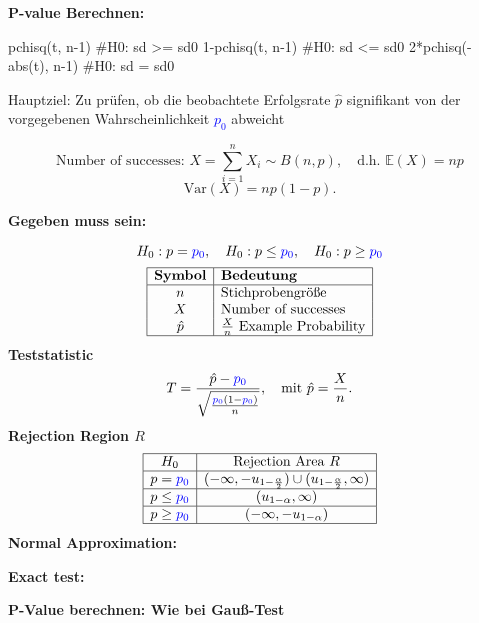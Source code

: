 \textbf{P-value Berechnen:}
\begin{rcode}{1}
pchisq(t, n-1) #H0: sd >= sd0
1-pchisq(t, n-1) #H0: sd <= sd0
2*pchisq(-abs(t), n-1) #H0: sd = sd0
\end{rcode}

\columnbreak
\begin{center}
\end{center}
\normalsize

Hauptziel: Zu prüfen, ob die beobachtete Erfolgsrate $\hat{p}$ signifikant von der vorgegebenen Wahrscheinlichkeit \textcolor{blue}{$p_0$} abweicht
\begin{center}
$$
\text{Number of successes: } X = \sum_{i=1}^n X_i \sim B(n, p), \quad \text{d.h. } \mathbb{E}(X) = np
$$$$
\text{Var}(X) = np(1-p).
$$
\end{center}
\large{\textbf{Gegeben muss sein:}}

\[
H_0: p = \textcolor{blue}{\textcolor{blue}{p_0}}, \quad H_0: p \leq \textcolor{blue}{p_0}, \quad H_0: p \geq \textcolor{blue}{p_0}
\]
\[
\begin{array}{|c|l|}
\hline
\textbf{Symbol} & \textbf{Bedeutung} \\
\hline
n& \text{Stichprobengröße} \\
X & \text{Number of successes} \\
\hat{p}& \frac{X}{n} \text{ Example Probability} \\
\hline
\end{array}
\]
\large{\textbf{Teststatistic}}
$$
T = \frac{\hat{p} - \textcolor{blue}{p_0}}{\sqrt{\frac{\textcolor{blue}{p_0}(1-\textcolor{blue}{p_0})}{n}}}, \quad \text{mit } \hat{p} = \frac{X}{n}.
$$
\large{\textbf{Rejection Region $R$}}
\[
\begin{array}{|c|c|}
\hline
H_0 & \text{Rejection Area } R \\ \hline
p = \textcolor{blue}{p_0} & (-\infty, -u_{1-\frac{\alpha}{2}}) \cup (u_{1-\frac{\alpha}{2}}, \infty) \\ \hline
p \leq \textcolor{blue}{p_0} & (u_{1-\alpha}, \infty) \\ \hline
p \geq \textcolor{blue}{p_0} & (-\infty, -u_{1-\alpha}) \\ \hline
\end{array}
\]
\large{\textbf{Normal Approximation:}}
\large{\textbf{Exact test:}}
\large{\textbf{P-Value berechnen: Wie bei Gauß-Test}}

